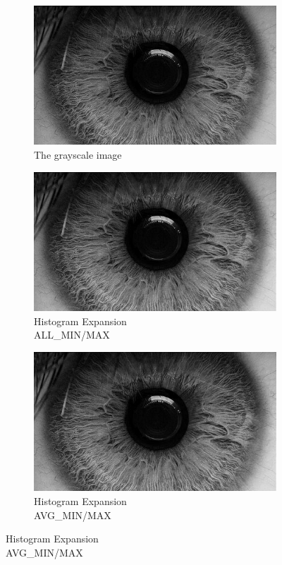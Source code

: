 \documentclass{article}
\begin{document}
\begin{figure}[H]
\centering

\begin{subfigure}[b]{0.5\linewidth}
\centering
  \includegraphics[width=0.9\linewidth]{res/grayscale.jpg}
  \caption{The grayscale image}
   \label{fig:hist_gray_org}
\end{subfigure}%

\begin{subfigure}[b]{0.5\linewidth}
\centering
  \includegraphics[width=0.9\linewidth]{res/gray_hist_all.jpg}
  \caption{Histogram Expansion \\ ALL\_MIN/MAX}
   \label{fig:hist_gray_all}
\end{subfigure}%
\begin{subfigure}[b]{0.5\linewidth}
\centering
  \includegraphics[width=0.9\linewidth]{res/gray_hist_avg.jpg}
  \caption{Histogram Expansion \\ AVG\_MIN/MAX}
   \label{fig:hist_gray_avg}
\end{subfigure}%



\end{figure}
\end{document}
